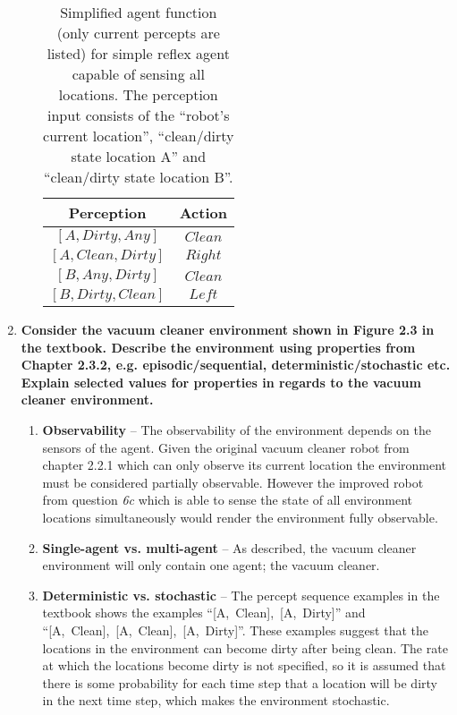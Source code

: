 \begin{enumerate}
\begin{enumerate}
\begin{table}
\begin{center}
\begin{tabular}{c|c}
\bfseries{Perception} & \bfseries{Action}\\
\hline
$\mathit{[A, Dirty, Any]}$ & $\mathit{Clean}$ \\
$\mathit{[A, Clean, Dirty]}$ & $\mathit{Right}$ \\
$\mathit{[B, Any, Dirty]}$ & $\mathit{Clean}$ \\
$\mathit{[B, Dirty, Clean]}$ & $\mathit{Left}$ \\
\end{tabular}
\caption{Simplified agent function (only current percepts are listed) for simple reflex agent capable of sensing all locations. The perception input consists of the ``robot's current location'', ``clean/dirty state location A'' and ``clean/dirty state location B''.}
\label{table:agent_function_reflex_percept}
\end{center}
\end{table}

\end{enumerate}

\item \textbf{Consider the vacuum cleaner environment shown in Figure 2.3 in the textbook. Describe the environment using properties from Chapter 2.3.2, e.g. episodic/sequential, deterministic/stochastic etc. Explain selected values for properties in regards to the vacuum cleaner environment.}\nopagebreak

\begin{enumerate}

\item \textbf{Observability} -- The observability of the environment depends on the sensors of the agent. Given the original vacuum cleaner robot from chapter 2.2.1 which can only observe its current location the environment must be considered partially observable. However the improved robot from question \textit{6c} which is able to sense the state of all environment locations simultaneously would render the environment fully observable.

\item \textbf{Single-agent vs. multi-agent} -- As described, the vacuum cleaner environment will only contain one agent; the vacuum cleaner.

\item \textbf{Deterministic vs. stochastic} -- The percept sequence examples in the textbook shows the examples ``[A,~Clean],~[A,~Dirty]'' and ``[A,~Clean],~[A,~Clean],~[A,~Dirty]''. These examples suggest that the locations in the environment can become dirty after being clean. The rate at which the locations become dirty is not specified, so it is assumed that there is some probability for each time step that a location will be dirty in the next time step, which makes the environment stochastic.


\end{enumerate}
\end{enumerate}
